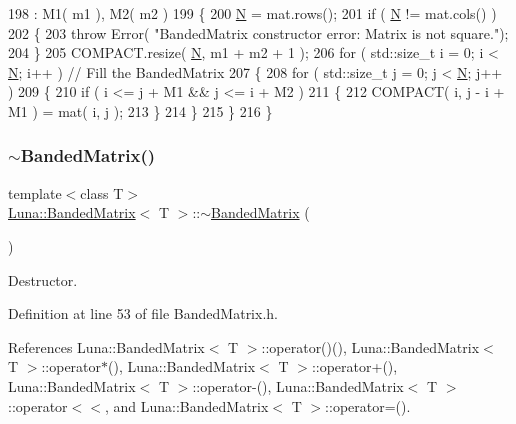 \begin{DoxyCode}
198                                                : M1( m1 ), M2( m2 )
199   \{
200     \hyperlink{namespaceHeat__plot_a7d050092798e28458a263710837bda77}{N} = mat.rows();
201     \textcolor{keywordflow}{if} ( \hyperlink{namespaceHeat__plot_a7d050092798e28458a263710837bda77}{N} != mat.cols() )
202     \{
203       \textcolor{keywordflow}{throw} Error( \textcolor{stringliteral}{"BandedMatrix constructor error: Matrix is not square."});
204     \}
205     COMPACT.resize( \hyperlink{namespaceHeat__plot_a7d050092798e28458a263710837bda77}{N}, m1 + m2 + 1 );
206     \textcolor{keywordflow}{for} ( std::size\_t i = 0; i < \hyperlink{namespaceHeat__plot_a7d050092798e28458a263710837bda77}{N}; i++ ) \textcolor{comment}{// Fill the BandedMatrix}
207     \{
208       \textcolor{keywordflow}{for} ( std::size\_t j = 0; j < \hyperlink{namespaceHeat__plot_a7d050092798e28458a263710837bda77}{N}; j++ )
209       \{
210         \textcolor{keywordflow}{if} ( i <= j + M1 && j <= i + M2 )
211         \{
212           COMPACT( i, j - i + M1 ) = mat( i, j );
213         \}
214       \}
215     \}
216   \}
\end{DoxyCode}
\mbox{\label{classLuna_1_1BandedMatrix_a299b47780a3ba18504c2d19998818bdf}} 
\subsubsection{\texorpdfstring{$\sim$\+Banded\+Matrix()}{~BandedMatrix()}}
{\footnotesize\ttfamily template$<$class T$>$ \\
\hyperlink{classLuna_1_1BandedMatrix}{Luna\+::\+Banded\+Matrix}$<$ T $>$\+::$\sim$\hyperlink{classLuna_1_1BandedMatrix}{Banded\+Matrix} (\begin{DoxyParamCaption}{ }\end{DoxyParamCaption})\hspace{0.3cm}{\ttfamily [inline]}}



Destructor. 



Definition at line 53 of file Banded\+Matrix.\+h.



References Luna\+::\+Banded\+Matrix$<$ T $>$\+::operator()(), Luna\+::\+Banded\+Matrix$<$ T $>$\+::operator$\ast$(), Luna\+::\+Banded\+Matrix$<$ T $>$\+::operator+(), Luna\+::\+Banded\+Matrix$<$ T $>$\+::operator-\/(), Luna\+::\+Banded\+Matrix$<$ T $>$\+::operator$<$$<$, and Luna\+::\+Banded\+Matrix$<$ T $>$\+::operator=().


